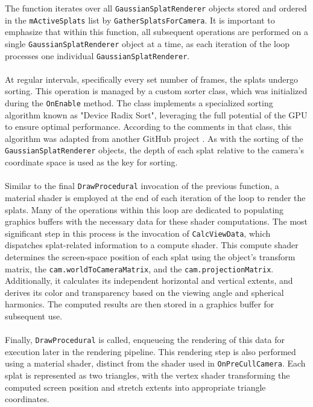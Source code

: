 \documentclass[12pt]{article}
\begin{document}
The function iterates over all \texttt{GaussianSplatRenderer} objects stored and ordered in the \texttt{m\textunderscore ActiveSplats} list by \texttt{GatherSplatsForCamera}. It is important to emphasize that within this function, all subsequent operations are performed on a single \texttt{GaussianSplatRenderer} object at a time, as each iteration of the loop processes one individual \texttt{GaussianSplatRenderer}.\\\\
At regular intervals, specifically every set number of frames, the splats undergo sorting. This operation is managed by a custom sorter class, which was initialized during the \texttt{OnEnable} method. The class implements a specialized sorting algorithm known as "Device Radix Sort", leveraging the full potential of the GPU to ensure optimal performance. According to the comments in that class, this algorithm was adapted from another GitHub project \cite{Sorting}. As with the sorting of the \texttt{GaussianSplatRenderer} objects, the depth of each splat relative to the camera’s coordinate space is used as the key for sorting.
\\\\
Similar to the final \texttt{DrawProcedural} invocation of the previous function, a material shader is employed at the end of each iteration of the loop to render the splats. Many of the operations within this loop are dedicated to populating graphics buffers with the necessary data for these shader computations. The most significant step in this process is the invocation of \texttt{CalcViewData}, which dispatches splat-related information to a compute shader. This compute shader determines the screen-space position of each splat using the object's transform matrix, the \texttt{cam.worldToCameraMatrix}, and the \texttt{cam.projectionMatrix}. Additionally, it calculates its independent horizontal and vertical extents, and derives its color and transparency based on the viewing angle and spherical harmonics. The computed results are then stored in a graphics buffer for subsequent use. \\\\
Finally, \texttt{DrawProcedural} is called, enqueueing the rendering of this data for execution later in the rendering pipeline. This rendering step is also performed using a material shader, distinct from the shader used in \texttt{OnPreCullCamera}. Each splat is represented as two triangles, with the vertex shader transforming the computed screen position and stretch extents into appropriate triangle coordinates.
\end{document}
